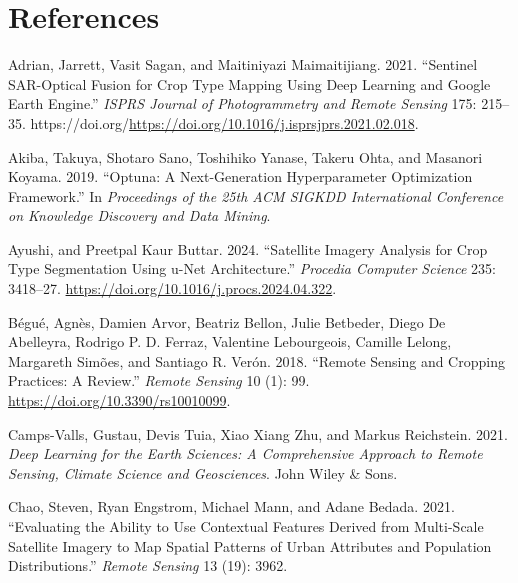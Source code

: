 \documentclass[
  journal,
  twocolumn]{IEEEtran}
\newlength{\cslhangindent}
\newlength{\cslentryspacingunit} %
\newenvironment{CSLReferences}[2] %
 {%
  \setlength{\parindent}{0pt}
  \ifodd #1
  \let\oldpar\par
  \def\par{\hangindent=\cslhangindent\oldpar}
  \fi
  \setlength{\parskip}{#2\cslentryspacingunit}
 }%
 {}
\begin{document}
\hypertarget{references}{%
\section*{References}\label{references}}

\hypertarget{refs}{}
\begin{CSLReferences}{1}{0}
\leavevmode{}%
Adrian, Jarrett, Vasit Sagan, and Maitiniyazi Maimaitijiang. 2021.
{``Sentinel SAR-Optical Fusion for Crop Type Mapping Using Deep Learning
and Google Earth Engine.''} \emph{ISPRS Journal of Photogrammetry and
Remote Sensing} 175: 215--35.
https://doi.org/\url{https://doi.org/10.1016/j.isprsjprs.2021.02.018}.

\leavevmode{}%
Akiba, Takuya, Shotaro Sano, Toshihiko Yanase, Takeru Ohta, and Masanori
Koyama. 2019. {``Optuna: A Next-Generation Hyperparameter Optimization
Framework.''} In \emph{Proceedings of the 25th {ACM} {SIGKDD}
International Conference on Knowledge Discovery and Data Mining}.

\leavevmode{}%
Ayushi, and Preetpal Kaur Buttar. 2024. {``Satellite Imagery Analysis
for Crop Type Segmentation Using u-Net Architecture.''} \emph{Procedia
Computer Science} 235: 3418--27.
\url{https://doi.org/10.1016/j.procs.2024.04.322}.

\leavevmode{}%
Bégué, Agnès, Damien Arvor, Beatriz Bellon, Julie Betbeder, Diego De
Abelleyra, Rodrigo P. D. Ferraz, Valentine Lebourgeois, Camille Lelong,
Margareth Simões, and Santiago R. Verón. 2018. {``Remote Sensing and
Cropping Practices: A Review.''} \emph{Remote Sensing} 10 (1): 99.
\url{https://doi.org/10.3390/rs10010099}.

\leavevmode{}%
Camps-Valls, Gustau, Devis Tuia, Xiao Xiang Zhu, and Markus Reichstein.
2021. \emph{Deep Learning for the Earth Sciences: A Comprehensive
Approach to Remote Sensing, Climate Science and Geosciences}. John Wiley
\& Sons.

\leavevmode{}%
Chao, Steven, Ryan Engstrom, Michael Mann, and Adane Bedada. 2021.
{``Evaluating the Ability to Use Contextual Features Derived from
Multi-Scale Satellite Imagery to Map Spatial Patterns of Urban
Attributes and Population Distributions.''} \emph{Remote Sensing} 13
(19): 3962.


\end{CSLReferences}
\end{document}
